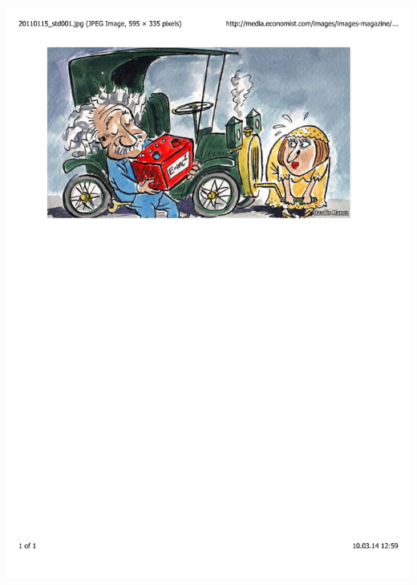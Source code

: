 \documentclass[mathserif,10pt]{beamer}
\begin{document}
\begin{frame}
\begin{columns}
\begin{column}{.50\textwidth}
	\includegraphics[viewport = 60 530 510 790, clip, scale=0.3]{figures/economist.pdf}
    \end{column}
    \end{columns}
\end{frame}
\end{document}
